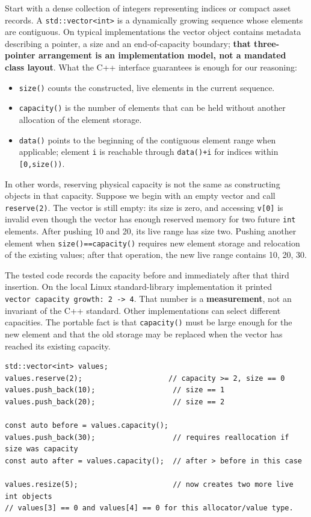 Start with a dense collection of integers representing indices or compact asset records. A \texttt{std::vector\textless{}int\textgreater{}} is a dynamically growing sequence whose elements are contiguous. On typical implementations the vector object contains metadata describing a pointer, a size and an end-of-capacity boundary; \textbf{that three-pointer arrangement is an implementation model, not a mandated class layout}. What the C++ interface guarantees is enough for our reasoning:

\begin{itemize}
\tightlist
\item
  \texttt{size()} counts the constructed, live elements in the current sequence.
\item
  \texttt{capacity()} is the number of elements that can be held without another allocation of the element storage.
\item
  \texttt{data()} points to the beginning of the contiguous element range when applicable; element \texttt{i} is reachable through \texttt{data()+i} for indices within \texttt{{[}0,size())}.
\end{itemize}

In other words, reserving physical capacity is not the same as constructing objects in that capacity. Suppose we begin with an empty vector and call \texttt{reserve(2)}. The vector is still empty: its size is zero, and accessing \texttt{v{[}0{]}} is invalid even though the vector has enough reserved memory for two future \texttt{int} elements. After pushing 10 and 20, its live range has size two. Pushing another element when \texttt{size()==capacity()} requires new element storage and relocation of the existing values; after that operation, the new live range contains 10, 20, 30.

The tested code records the capacity before and immediately after that third insertion. On the local Linux standard-library implementation it printed \texttt{vector\ capacity\ growth:\ 2\ -\textgreater{}\ 4}. That number is a \textbf{measurement}, not an invariant of the C++ standard. Other implementations can select different capacities. The portable fact is that \texttt{capacity()} must be large enough for the new element and that the old storage may be replaced when the vector has reached its existing capacity.

\begin{verbatim}
std::vector<int> values;
values.reserve(2);                    // capacity >= 2, size == 0
values.push_back(10);                  // size == 1
values.push_back(20);                  // size == 2

const auto before = values.capacity();
values.push_back(30);                  // requires reallocation if size was capacity
const auto after = values.capacity();  // after > before in this case

values.resize(5);                      // now creates two more live int objects
// values[3] == 0 and values[4] == 0 for this allocator/value type.
\end{verbatim}


